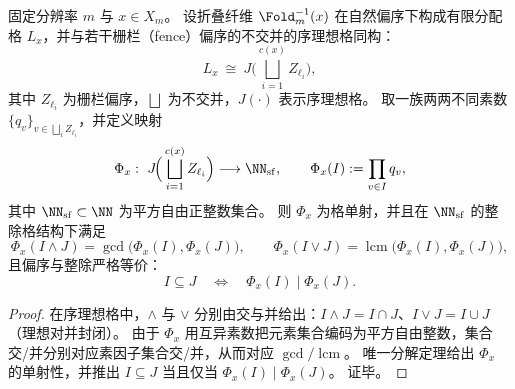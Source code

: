 \begin{theorem}\label{thm:pom-fiber-lattice-squarefree-prime-register-gcd-lcm}
固定分辨率 \(m\) 与 \(x\in X_m\)。
设折叠纤维 \(\Fold_m^{-1}(x)\) 在自然偏序下构成有限分配格 \(L_x\)，并与若干栅栏（fence）偏序的不交并的序理想格同构：
\[
L_x\ \cong\ J\!\Big(\bigsqcup_{i=1}^{c(x)} Z_{\ell_i}\Big),
\]
其中 \(Z_{\ell_i}\) 为栅栏偏序，\(\bigsqcup\) 为不交并，\(J(\cdot)\) 表示序理想格。
取一族两两不同素数 \(\{q_v\}_{v\in\bigsqcup_i Z_{\ell_i}}\)，并定义映射
\[
\Phi_x:\ J\!\Big(\bigsqcup_{i=1}^{c(x)} Z_{\ell_i}\Big)\longrightarrow \NN_{\mathrm{sf}},
\qquad
\Phi_x(I):=\prod_{v\in I} q_v,
\]
其中 \(\NN_{\mathrm{sf}}\subset\NN\) 为平方自由正整数集合。
则 \(\Phi_x\) 为格单射，并且在 \(\NN_{\mathrm{sf}}\) 的整除格结构下满足
\[
\Phi_x(I\wedge J)=\gcd\big(\Phi_x(I),\Phi_x(J)\big),
\qquad
\Phi_x(I\vee J)=\operatorname{lcm}\big(\Phi_x(I),\Phi_x(J)\big),
\]
且偏序与整除严格等价：
\[
I\subseteq J\quad\Longleftrightarrow\quad \Phi_x(I)\mid \Phi_x(J).
\]
\end{theorem}

\begin{proof}
在序理想格中，\(\wedge\) 与 \(\vee\) 分别由交与并给出：\(I\wedge J=I\cap J\)、\(I\vee J=I\cup J\)（理想对并封闭）。
由于 \(\Phi_x\) 用互异素数把元素集合编码为平方自由整数，集合交/并分别对应素因子集合交/并，从而对应 \(\gcd/\operatorname{lcm}\)。
唯一分解定理给出 \(\Phi_x\) 的单射性，并推出 \(I\subseteq J\) 当且仅当 \(\Phi_x(I)\mid \Phi_x(J)\)。
证毕。
\end{proof}

\endinput
